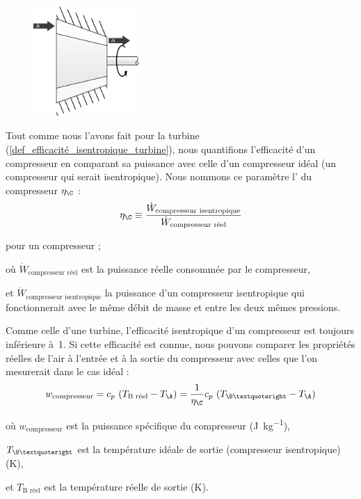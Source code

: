		\begin{figure}
			\begin{center}
				\includegraphics[width=4cm]{images/symbole_compresseur.png}
			\end{center}
			\label{fig_schéma_compresseur2}
		\end{figure}

		Tout comme nous l’avons fait pour la turbine (\ref{def_efficacité_isentropique_turbine}), nous quantifions l’efficacité d’un compresseur en comparant sa puissance avec celle d’un compresseur idéal (un compresseur qui serait isentropique). Nous nommons ce paramètre l’ du compresseur $\eta_\C$ :
		\begin{equation}
			\eta_\C \equiv \frac{\dot W_\text{compresseur isentropique}}{\dot W_\text{compresseur réel}}
			\label{def_efficacité_isentropique_compresseur}
		\end{equation}
		\begin{equationterms}
			\item pour un compresseur ;
			\item où \tab $\dot W_\text{compresseur réel}$ \tab\tab\tab est la puissance réelle consommée par le compresseur,
			\item et \tab $\dot W_\text{compresseur isentropique}$ \tab la puissance d’un compresseur isentropique qui fonctionnerait avec le même débit de masse et entre les deux mêmes pressions.
		\end{equationterms}

		Comme celle d’une turbine, l’efficacité isentropique d’un compresseur est toujours inférieure à~1. Si cette efficacité est connue, nous pouvons comparer les propriétés réelles de l’air à l’entrée et à la sortie du compresseur avec celles que l’on mesurerait dans le cas idéal :
		\begin{equation}
			w_\text{compresseur} = c_p \ (T_\text{B réel} - T_\A) = \frac{1}{\eta_\C} c_p \ (T_{\B’} - T_\A)
			\label{eq_puissance_compresseur}
		\end{equation}
		\begin{equationterms}
			\item où \tab $w_\text{compresseur}$ 	\tab est la puissance spécifique du compresseur (\si{\joule\per\kilogram}),
			\item 	\tab $T_{\B’}$ 					\tab\tab\tab est la température idéale de sortie (compresseur isentropique) (\si{\kelvin}),
			\item et \tab $T_\text{B réel}$ 			\tab est la température réelle de sortie (\si{\kelvin}).
		\end{equationterms}

